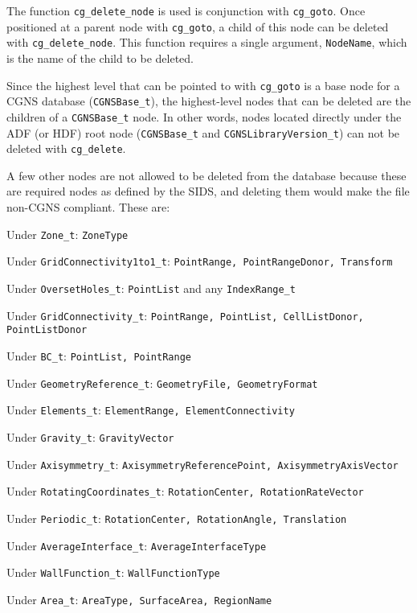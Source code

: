 The function \texttt{cg\_delete\_node} is used is conjunction with
\texttt{cg\_goto}.
Once positioned at a parent node with \texttt{cg\_goto}, a child of
this node can be deleted with \texttt{cg\_delete\_node}.
This function requires a single argument, \texttt{NodeName}, which is
the name of the child to be deleted.

Since the highest level that can be pointed to with \texttt{cg\_goto} is
a base node for a CGNS database
(\texttt{CGNSBase\_t}), the
highest-level nodes that can be deleted are the children of a
\texttt{CGNSBase\_t} node.
In other words, nodes located directly under the ADF (or HDF) root node
(\texttt{CGNSBase\_t} and
\texttt{CGNSLibraryVersion\_t})
can not be deleted with \texttt{cg\_delete}.

A few other nodes are not allowed to be deleted from the database
because these are required nodes as defined by the SIDS, and deleting
them would make the file non-CGNS compliant.
These are:
\begin{itemize*}
\item Under \texttt{Zone\_t}:
      \texttt{ZoneType} 
\item Under \texttt{GridConnectivity1to1\_t}:
      \texttt{PointRange, PointRangeDonor, Transform}
\item Under \texttt{OversetHoles\_t}:
      \texttt{PointList} and any \texttt{IndexRange\_t}
\item Under \texttt{GridConnectivity\_t}:
      \texttt{PointRange, PointList, CellListDonor, PointListDonor}
\item Under \texttt{BC\_t}:
      \texttt{PointList, PointRange}
\item Under \texttt{GeometryReference\_t}:
      \texttt{GeometryFile, GeometryFormat}
\item Under \texttt{Elements\_t}:
      \texttt{ElementRange, ElementConnectivity}
\item Under \texttt{Gravity\_t}:
      \texttt{GravityVector}
\item Under \texttt{Axisymmetry\_t}:
      \texttt{AxisymmetryReferencePoint, AxisymmetryAxisVector}
\item Under \texttt{RotatingCoordinates\_t}:
      \texttt{RotationCenter, RotationRateVector}
\item Under \texttt{Periodic\_t}:
      \texttt{RotationCenter, RotationAngle, Translation}
\item Under \texttt{AverageInterface\_t}:
      \texttt{AverageInterfaceType}
\item Under \texttt{WallFunction\_t}:
      \texttt{WallFunctionType}
\item Under \texttt{Area\_t}:
      \texttt{AreaType, SurfaceArea, RegionName}
\end{itemize*}

